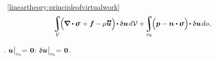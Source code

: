 \vspace{-0.2em}\noindent
{} ~\eqref{lineartheory:principleofvirtualwork}
\begin{equation*}
\displaystyle\integral\displaylimits_{\mathcal{V}} \hspace{-0.4ex} \Bigl( \hspace{-0.1ex} \boldnabla \dotp \linearstress \hspace{.1ex} + \bm{f} \hspace{-0.1ex} - \hspace{-0.1ex} \rho \hspace{.1ex} \mathdotdotabove{\bm{u}} \hspace{.1ex} \Bigr) \hspace{-0.3ex} \dotp \variation{\bm{u}} \hspace{.25ex} d\mathcal{V}
+ \hspace{-0.3ex}
\displaystyle\integral\displaylimits_{o_2} \hspace{-0.4ex} \Bigl( \bm{p} - \unitnormalvector \dotp \linearstress \Bigr) \hspace{-0.3ex} \dotp \variation{\bm{u}} \hspace{.25ex} do
\hspace{.1ex} ,
\end{equation*}

\vspace{-0.4em}\noindent
{}
.
${\bm{u} \hspace{.1ex} \bigr|_{o_1} \hspace{-0.64ex} = \hspace{.2ex} \bm{0}}$:
${ \updelta\hspace{-0.1ex}\bm{u} \hspace{.1ex} \bigr|_{o_1} \hspace{-0.64ex} = \hspace{.2ex} \bm{0} }$.

